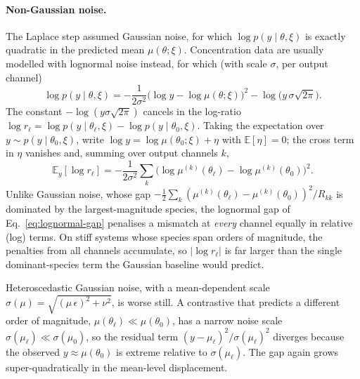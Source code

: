 \paragraph{Non-Gaussian noise.}
The Laplace step assumed Gaussian noise, for which $\log p(y\mid\theta,\xi)$ is
exactly quadratic in the predicted mean $\mu(\theta;\xi)$. Concentration data are
usually modelled with lognormal noise instead, for which (with scale $\sigma$, per
output channel)
\begin{equation}
\label{eq:lognormal-ll}
\log p(y\mid\theta,\xi) = -\frac{1}{2\sigma^2}\bigl(\log y-\log\mu(\theta;\xi)\bigr)^2 - \log\bigl(y\,\sigma\sqrt{2\pi}\bigr).
\end{equation}
The constant $-\log(y\sigma\sqrt{2\pi})$ cancels in the log-ratio $\log r_\ell=\log
p(y\mid\theta_\ell,\xi)-\log p(y\mid\theta_0,\xi)$. Taking the expectation over
$y\sim p(y\mid\theta_0,\xi)$, write $\log y=\log\mu(\theta_0;\xi)+\eta$ with
$\mathbb{E}[\eta]=0$; the cross term in $\eta$ vanishes and, summing over output
channels $k$,
\begin{equation}
\label{eq:lognormal-gap}
\mathbb{E}_y[\log r_\ell] = -\frac{1}{2\sigma^2}\sum_k\bigl(\log\mu^{(k)}(\theta_\ell)-\log\mu^{(k)}(\theta_0)\bigr)^2 .
\end{equation}
Unlike Gaussian noise, whose gap $-\frac{1}{2}\sum_k(\mu^{(k)}(\theta_\ell)-\mu^{(k)}(\theta_0))^2/R_{kk}$
is dominated by the largest-magnitude species, the lognormal gap of
Eq.~\eqref{eq:lognormal-gap} penalises a mismatch at \emph{every} channel equally in
relative (log) terms. On stiff systems whose species span orders of magnitude, the
penalties from all channels accumulate, so $|\log r_\ell|$ is far larger than the
single dominant-species term the Gaussian baseline would predict.

Heteroscedastic Gaussian noise, with a mean-dependent scale
$\sigma(\mu)=\sqrt{(\mu\,\epsilon)^2+\nu^2}$, is worse still. A contrastive that
predicts a different order of magnitude, $\mu(\theta_\ell)\ll\mu(\theta_0)$, has a
narrow noise scale $\sigma(\mu_\ell)\ll\sigma(\mu_0)$, so the residual term
$(y-\mu_\ell)^2/\sigma(\mu_\ell)^2$ diverges because the observed
$y\approx\mu(\theta_0)$ is extreme relative to $\sigma(\mu_\ell)$. The gap again grows
super-quadratically in the mean-level displacement.

